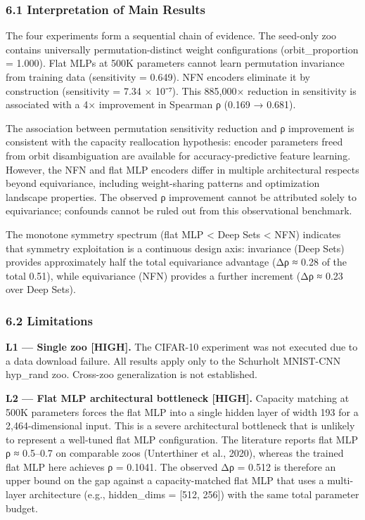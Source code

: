 
\subsubsection{6.1 Interpretation of Main Results}

The four experiments form a sequential chain of evidence. The seed-only zoo contains universally permutation-distinct weight configurations (orbit_proportion = 1.000). Flat MLPs at 500K parameters cannot learn permutation invariance from training data (sensitivity = 0.649). NFN encoders eliminate it by construction (sensitivity = 7.34 × 10⁻⁷). This 885,000× reduction in sensitivity is associated with a 4× improvement in Spearman ρ (0.169 → 0.681).

The association between permutation sensitivity reduction and ρ improvement is consistent with the capacity reallocation hypothesis: encoder parameters freed from orbit disambiguation are available for accuracy-predictive feature learning. However, the NFN and flat MLP encoders differ in multiple architectural respects beyond equivariance, including weight-sharing patterns and optimization landscape properties. The observed ρ improvement cannot be attributed solely to equivariance; confounds cannot be ruled out from this observational benchmark.

The monotone symmetry spectrum (flat MLP < Deep Sets < NFN) indicates that symmetry exploitation is a continuous design axis: invariance (Deep Sets) provides approximately half the total equivariance advantage (Δρ ≈ 0.28 of the total 0.51), while equivariance (NFN) provides a further increment (Δρ ≈ 0.23 over Deep Sets).

\subsubsection{6.2 Limitations}

\textbf{L1 — Single zoo [HIGH].} The CIFAR-10 experiment was not executed due to a data download failure. All results apply only to the Schurholt MNIST-CNN hyp_rand zoo. Cross-zoo generalization is not established.

\textbf{L2 — Flat MLP architectural bottleneck [HIGH].} Capacity matching at 500K parameters forces the flat MLP into a single hidden layer of width 193 for a 2,464-dimensional input. This is a severe architectural bottleneck that is unlikely to represent a well-tuned flat MLP configuration. The literature reports flat MLP ρ ≈ 0.5–0.7 on comparable zoos (Unterthiner et al., 2020), whereas the trained flat MLP here achieves ρ = 0.1041. The observed Δρ = 0.512 is therefore an upper bound on the gap against a capacity-matched flat MLP that uses a multi-layer architecture (e.g., hidden_dims = [512, 256]) with the same total parameter budget.

